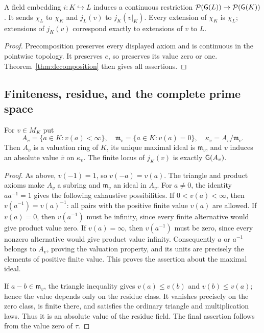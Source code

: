 \begin{proposition}\label{prop:fieldfunctor}
A field embedding $i:K\hookrightarrow L$ induces a continuous restriction
$\mathcal P(\mathsf G(L))\to\mathcal P(\mathsf G(K))$. It sends $\chi_L$ to $\chi_K$
and $j_L(v)$ to $j_K(v|_K)$. Every extension of $\chi_K$ is $\chi_L$;
extensions of $j_K(v)$ correspond exactly to extensions of $v$ to $L$.
\end{proposition}
\begin{proof}
Precomposition preserves every displayed axiom and is continuous in
the pointwise topology. It preserves $e$, so preserves its value zero
or one. Theorem~\ref{thm:decomposition} then gives all assertions.
\end{proof}

\subsection{Finiteness, residue, and the complete prime space}

\begin{proposition}
\label{prop:finite}
For $v\in M_K$ put
\[
 A_v=\{a\in K:v(a)<\infty\},\quad
 \mathfrak m_v=\{a\in K:v(a)=0\},\quad
 \kappa_v=A_v/\mathfrak m_v.
\]
Then $A_v$ is a valuation ring of $K$, its unique maximal ideal is
$\mathfrak m_v$, and $v$ induces an absolute value $\overline v$ on
$\kappa_v$. The finite locus of $j_K(v)$ is exactly $\mathsf G(A_v)$.
\end{proposition}
\begin{proof}
As above, $v(-1)=1$, so $v(-a)=v(a)$. The triangle and product axioms
make $A_v$ a subring and $\mathfrak m_v$ an ideal in $A_v$.
For $a\ne0$, the identity $aa^{-1}=1$ gives the following exhaustive
possibilities. If $0<v(a)<\infty$, then $v(a^{-1})=v(a)^{-1}$:
all pairs with the positive finite value $v(a)$ are allowed. If $v(a)=0$,
then $v(a^{-1})$ must be infinity, since every finite alternative would
give product value zero. If $v(a)=\infty$, then $v(a^{-1})$ must be zero,
since every nonzero alternative would give product value infinity.
Consequently $a$ or $a^{-1}$ belongs to $A_v$, proving the valuation
property, and its units are precisely the elements of positive finite
value. This proves the assertion about the maximal ideal.

If $a-b\in\mathfrak m_v$, the triangle inequality gives $v(a)\le v(b)$
and $v(b)\le v(a)$; hence the value depends only on the residue class.
It vanishes precisely on the zero class, is finite there, and satisfies
the ordinary triangle and multiplication laws. Thus it is an absolute
value of the residue field. The final assertion follows from the value
zero of $\tau$.
\end{proof}

